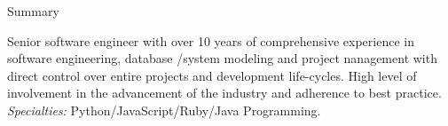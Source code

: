 \documentclass[]{mcdowellcv}
\begin{document}
    \makeheader
    \label{Contact}

    \begin{cvsection}{Summary}
        \label{Summary}
        \begin{cvsubsection}{}{}{}
            Senior software engineer with over 10 years of comprehensive experience in software engineering, database /system modeling and project nanagement with direct control over entire projects and development life-cycles. High level of involvement in the advancement of the industry and adherence to best practice.
            \\
            \textit{Specialties:} Python/JavaScript/Ruby/Java Programming.
        \end{cvsubsection}
    \end{cvsection}
\end{document}
